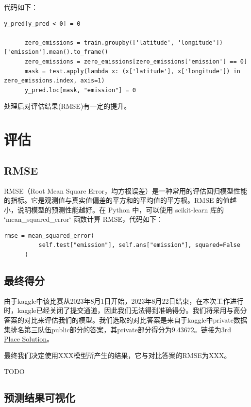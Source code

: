 \documentclass{ctexart}
\begin{document}
代码如下：

\begin{lstlisting}[style=Python]
      y_pred[y_pred < 0] = 0
      
      zero_emissions = train.groupby(['latitude', 'longitude'])['emission'].mean().to_frame()
      zero_emissions = zero_emissions[zero_emissions['emission'] == 0]
      mask = test.apply(lambda x: (x['latitude'], x['longitude']) in zero_emissions.index, axis=1)
      y_pred.loc[mask, "emission"] = 0
\end{lstlisting}

处理后对评估结果(RMSE)有一定的提升。

\section{评估}

\subsection{RMSE}

RMSE（Root Mean Square Error，均方根误差）是一种常用的评估回归模型性能的指标。它是观测值与真实值偏差的平方和的平均值的平方根。RMSE 的值越小，说明模型的预测性能越好。在 Python 中，可以使用 scikit-learn 库的 `mean\_squared\_error` 函数计算 RMSE，代码如下：

\begin{lstlisting}[style=Python]
      rmse = mean_squared_error(
          self.test["emission"], self.ans["emission"], squared=False
      )
\end{lstlisting}

\subsection{最终得分}

由于kaggle中该比赛从2023年8月1日开始，2023年8月22日结束，在本次工作进行时，kaggle已经关闭了提交通道，因此我们无法得到准确得分。我们将采用与高分答案的对比来评估我们的模型。我们选取的对比答案是来自于kaggle中private数据集排名第三队伍public部分的答案，其private部分得分为9.43672。链接为\href{https://www.kaggle.com/competitions/playground-series-s3e20/discussion/433822}{3rd Place Solution}。

最终我们决定使用XXX模型所产生的结果，它与对比答案的RMSE为XXX。

TODO

\subsection{预测结果可视化}
\end{document}
